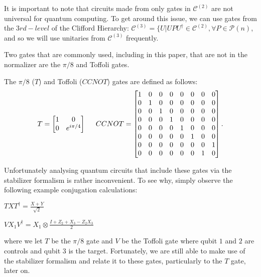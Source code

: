 \documentclass[12pt]{dalthesis}
\begin{document}
It is important to note that circuits made from only gates in $\mathcal{C}^{(2)}$ are not universal for quantum computing. To get around this issue, we can use gates from the $3rd-level$ of the Clifford Hierarchy: $\mathcal{C}^{(3)} = \{ U | UPU^{\dag} \in \mathcal{C}^{(2)}, \forall P \in \mathcal{P}(n)$, and so we will use unitaries from $\mathcal{C}^{(3)}$ frequently.

Two gates that are commonly used, including in this paper, that are not in the normalizer are the $\pi /8$ and Toffoli gates. 

\begin{definition}
The $\pi /8$ ($T$) and Toffoli ($CCNOT$) gates are defined as follows:
\begin{equation}
T = 
\begin{bmatrix}
1 & 0 \\
0 & e^{i\pi/4}
\end{bmatrix}
\hspace{5mm}
CCNOT = 
\begin{bmatrix}
1 & 0 & 0 & 0 & 0 & 0 & 0 & 0 \\
0 & 1 & 0 & 0 & 0 & 0 & 0 & 0 \\
0 & 0 & 1 & 0 & 0 & 0 & 0 & 0 \\
0 & 0 & 0 & 1 & 0 & 0 & 0 & 0 \\
0 & 0 & 0 & 0 & 1 & 0 & 0 & 0 \\
0 & 0 & 0 & 0 & 0 & 1 & 0 & 0 \\
0 & 0 & 0 & 0 & 0 & 0 & 0 & 1 \\
0 & 0 & 0 & 0 & 0 & 0 & 1 & 0 \\
\end{bmatrix}.
\end{equation}
\end{definition}


Unfortunately analysing quantum circuits that include these gates via the stabilizer formalism is rather inconvenient. To see why, simply observe the following example conjugation calculations:
\begin{center}
$TXT^{\dag} = \frac{X+Y}{\sqrt{2}}$
\end{center}
\begin{center}
$VX_1V^{\dag} = X_1 \otimes \frac{I + Z_2 +X_3 -Z_2X_3}{2}$
\end{center}
where we let $T$ be the $\pi /8$ gate and $V$ be the Toffoli gate where qubit $1$ and $2$ are controls and qubit $3$ is the target. Fortunately, we are still able to make use of the stabilizer formalism and relate it to these gates, particularly to the $T$ gate, later on.
\end{document}
